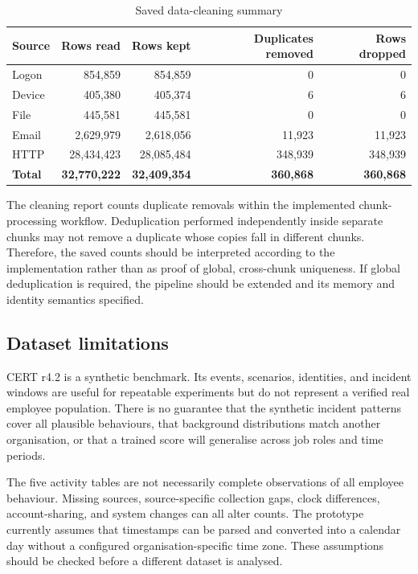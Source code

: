 \documentclass[12pt,a4paper,oneside]{report}
\newcommand{\tablefont}{\small}
\begin{document}
\begin{table}[H]
\centering
\tablefont
\caption{Saved data-cleaning summary}
\label{tab:cleaning-summary}
\begin{tabularx}{\textwidth}{|p{}|R|R|R|R|}
\hline
\textbf{Source} & \textbf{Rows read} & \textbf{Rows kept} & \textbf{Duplicates removed} & \textbf{Rows dropped}\\\hline
Logon & 854,859 & 854,859 & 0 & 0\\\hline
Device & 405,380 & 405,374 & 6 & 6\\\hline
File & 445,581 & 445,581 & 0 & 0\\\hline
Email & 2,629,979 & 2,618,056 & 11,923 & 11,923\\\hline
HTTP & 28,434,423 & 28,085,484 & 348,939 & 348,939\\\hline
\textbf{Total} & \textbf{32,770,222} & \textbf{32,409,354} & \textbf{360,868} & \textbf{360,868}\\\hline
\end{tabularx}
\end{table}

The cleaning report counts duplicate removals within the implemented
chunk-processing workflow. Deduplication performed independently
inside separate chunks may not remove a duplicate whose copies fall in
different chunks. Therefore, the saved counts should be interpreted
according to the implementation rather than as proof of global,
cross-chunk uniqueness. If global deduplication is required, the
pipeline should be extended and its memory and identity semantics
specified.

\subsection{Dataset limitations}
CERT r4.2 is a synthetic benchmark. Its events, scenarios, identities,
and incident windows are useful for repeatable experiments but do not
represent a verified real employee population. There is no guarantee
that the synthetic incident patterns cover all plausible behaviours,
that background distributions match another organisation, or that a
trained score will generalise across job roles and time periods.

The five activity tables are not necessarily complete observations of
all employee behaviour. Missing sources, source-specific collection
gaps, clock differences, account-sharing, and system changes can all
alter counts. The prototype currently assumes that timestamps can be
parsed and converted into a calendar day without a configured
organisation-specific time zone. These assumptions should be checked
before a different dataset is analysed.
\end{document}
